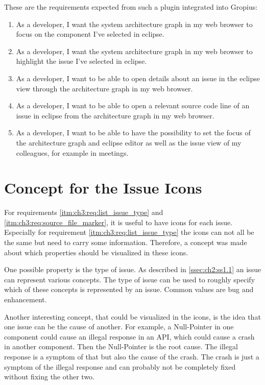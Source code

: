 These are the requirements expected from such a plugin integrated into \gls{Gropius}:
\begin{enumerate}
	\setcounter{enumi}{\value{enumarteCounter}} %
	\item As a developer, I want the system architecture graph in my web browser to focus on the component I've selected in eclipse.
	\item As a developer, I want the system architecture graph in my web browser to highlight the issue I've selected in eclipse.
	\item As a developer, I want to be able to open details about an issue in the eclipse view through the architecture graph in my web browser.
	\item As a developer, I want to be able to open a relevant source code line of an issue in eclipse from the architecture graph in my web browser.
	\item As a developer, I want to be able to have the possibility to set the focus of the architecture graph and eclipse editor as well as the issue view of my colleagues, for example in meetings.
\end{enumerate}

\section{Concept for the Issue Icons}
\label{sec:ch3:s2}
For requirements \ref{itm:ch3:req:list_issue_type} and \ref{itm:ch3:req:source_file_marker}, it is useful to have icons for each issue.
Especially for requirement \ref{itm:ch3:req:list_issue_type} the icons can not all be the same but need to carry some information.
Therefore, a concept was made about which properties should be visualized in these icons.

One possible property is the type of issue.
As described in \cref{ssec:ch2:ss1.1} an issue can represent various concepts.
The type of issue can be used to roughly specify which of these concepts is represented by an issue.
Common values are bug and enhancement.

Another interesting concept, that could be visualized in the icons, is the idea that one issue can be the cause of another.
For example, a Null-Pointer in one component could cause an illegal response in an \gls{API}, which could cause a crash in another component.
Then the Null-Pointer is the root cause.
The illegal response is a symptom of that but also the cause of the crash.
The crash is just a symptom of the illegal response and can probably not be completely fixed without fixing the other two.

